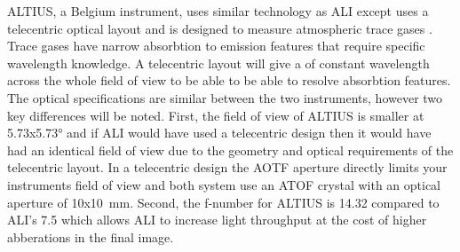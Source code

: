  ALTIUS, a Belgium instrument, uses similar technology as ALI except uses a telecentric optical layout and is designed to measure atmospheric trace gases \citep{Dekemper2012}. Trace gases have narrow absorbtion to emission features that require specific wavelength knowledge. A telecentric layout will give a of constant wavelength across the whole field of view to be able to be able to resolve absorbtion features. The optical specifications are similar between the two instruments, however two key differences will be noted. First, the field of view of ALTIUS is smaller at 5.73x5.73\si{\degree} and if ALI would have used a telecentric design then it would have had an identical field of view due to the geometry and optical requirements of the telecentric layout. In a telecentric design the AOTF aperture directly limits your instruments field of view and both system use an ATOF crystal with an optical aperture of 10x10~mm. Second, the f-number for ALTIUS is 14.32 compared to ALI's 7.5 which allows ALI to increase light throughput at the cost of higher abberations in the final image.
